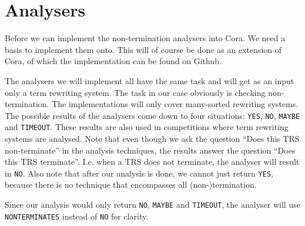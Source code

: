 \chapter{Analysers}\label{analysers}
Before we can implement the non-termination analysers into Cora. We need a basis to implement them onto. This will of course be done as an extension of Cora, of which the implementation can be found on Github\cite{CoraFork2019}.

The analysers we will implement all have the same task and will get as an input only a term rewriting system. The task in our case obviously is checking non-termination. The implementations will only cover many-sorted rewriting systems. The possible results of the analysers come down to four situations: \texttt{YES}, \texttt{NO}, \texttt{MAYBE} and \texttt{TIMEOUT}. These results are also used in competitions where term rewriting systems are analysed\cite{TermPortal}. Note that even though we ask the question ``Does this TRS non-terminate'' in the analysis techniques, the results answer the question ``Does this TRS terminate''. I.e. when a TRS does not terminate, the analyser will result in \texttt{NO}. Also note that after our analysis is done, we cannot just return \texttt{YES}, because there is no technique that encompasses all (non-)termination. 

Since our analysis would only return \texttt{NO}, \texttt{MAYBE} and \texttt{TIMEOUT}, the analyser will use \texttt{NONTERMINATES} instead of \texttt{NO} for clarity. 